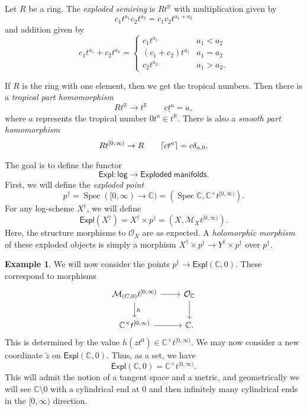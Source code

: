 \documentclass[leqno, openany]{memoir}
\DeclarePairedDelimiter{\ceil}{\lceil}{\rceil}
\theoremstyle{definition}
\newtheorem{exm}[thm]{Example}
\theoremstyle{remark}
\theoremstyle{plain}
\theoremstyle{definition}
\theoremstyle{remark}
\newcommand{\R}{\mathbb{R}}
\newcommand{\C}{\mathbb{C}}
\newcommand{\mc}[1]{\mathcal{#1}}
\newcommand{\ms}[1]{\mathsf{#1}}
\newcommand{\ul}[1]{\underline{#1}}
\newcommand{\wt}[1]{\widetilde{#1}}
\DeclareMathOperator{\Spec}{Spec}
\begin{document}
Let $R$ be a ring. The \textit{exploded semiring} is $Rt^{\R}$ with multiplication given by
\[ c_1 t^{a_1} c_2 t^{a_2} = c_1c_2 t^{a_1+a_2} \]
and addition given by
\[ c_1 t^{a_1} + c_2 t^{a_2} = \begin{cases}
                                 c_1 t^{a_1} & a_1 < a_2 \\
                                 (c_1 + c_2) t^{a_1} & a_1 = a_2 \\
                                 c_2 t^{a_2} & a_1 > a_2.
                               \end{cases}
\]

If $R$ is the ring with one element, then we get the tropical numbers. Then there is a \textit{tropical part homomorphism}
\[ R t^{\R} \to t^{\R} \qquad \ul{ct^a} = a, \]
where $a$ represents the tropical number $0t^a \in t^{\R}$. There is also a \textit{smooth part homomorphism}
\[ R t^{[0, \infty)} \to R \qquad \ceil{ct^a} = c \delta_{a,0}. \]

The goal is to define the functor
\[ \ms{Expl} \colon \ms{log} \to \ms{Exploded\ manifolds}. \]
First, we will define the \textit{exploded point}
\[ p^{\dag} = \Spec([0, \infty) \to \C) = (\Spec \C, \C^{\times}t^{[0, \infty)}). \]
For any log-scheme $X^{\dag}$, we will define
\[ \ms{Expl}(X^{\dag}) = X^{\dag} \times p^{\dag} = (X, \mc{M}_X t^{[0, \infty)}). \]
Here, the structure morphisms to $\mc{O}_X$ are as expected. A \textit{holomorphic morphism} of these exploded objects is simply a morphism $X^{\dag} \times p^{\dag} \to Y^{\dag} \times p^{\dag}$ over $p^{\dag}$.

\begin{exm}
  We will now consider the points $p^{\dag} \to \ms{Expl}(\C, 0)$. These correspond to morphisms
  \begin{equation}
    \begin{tikzcd}
      \mc{M}_{(C, 0)} t^{[0, \infty)} \ar{d}{h} \ar{r} & \mc{O}_{\C} \ar{d} \\
      \C^{\times} t^{[0, \infty)} \ar{r} & \C.
    \end{tikzcd}
  \end{equation}
  This is determined by the value $h(zt^0) \in \C^{\times}t^{[0, \infty)}$. We may now consider a new coordinate $\wt{z}$ on $\ms{Expl}(\C, 0)$. Thus, as a set, we have
  \[ \ms{Expl}(\C, 0) = \C^{\times}t^{[0, \infty)}. \]
  This will admit the notion of a tangent space and a metric, and geometrically we will see $\C \setminus 0$ with a cylindrical end at $0$ and then infinitely many cylindrical ends in the $[0, \infty)$ direction.
\end{exm}
\end{document}
